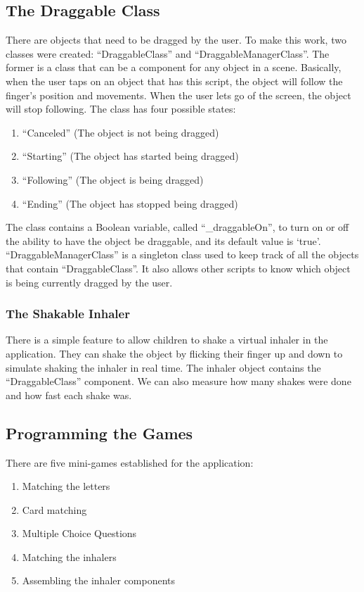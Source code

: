 \subsection*{The Draggable Class}
There are objects that need to be dragged by the user. To make this work, two classes were created: “DraggableClass\normalfont” and “DraggableManagerClass\normalfont”. The former is a class that can be a component for any object in a scene. Basically, when the user taps on an object that has this script, the object will follow the finger’s position and movements. When the user lets go of the screen, the object will stop following. The class has four possible states:
\begin{enumerate}

\item{“Canceled” (The object is not being dragged)}
\item{“Starting” (The object has started being dragged)}
\item{“Following” (The object is being dragged)}
\item{“Ending” (The object has stopped being dragged)}
\end{enumerate}
The class contains a Boolean variable, called “\_draggableOn\normalfont”, to turn on or off the ability to have the object be draggable, and its default value is ‘true\normalfont’. “DraggableManagerClass\normalfont” is a singleton class used to keep track of all the objects that contain “DraggableClass\normalfont”. It also allows other scripts to know which object is being currently dragged by the user.
\subsubsection*{The Shakable Inhaler}
There is a simple feature to allow children to shake a virtual inhaler in the application. They can shake the object by flicking their finger up and down to simulate shaking the inhaler in real time. The inhaler object contains the “DraggableClass\normalfont” component. We can also measure how many shakes were done and how fast each shake was.


\subsection{Programming the Games}

There are five mini-games established for the application:
\begin{enumerate}
\item{Matching the letters}

\item{Card matching}

\item{Multiple Choice Questions}

\item{Matching the inhalers}

\item{Assembling the inhaler components}
\end{enumerate}

